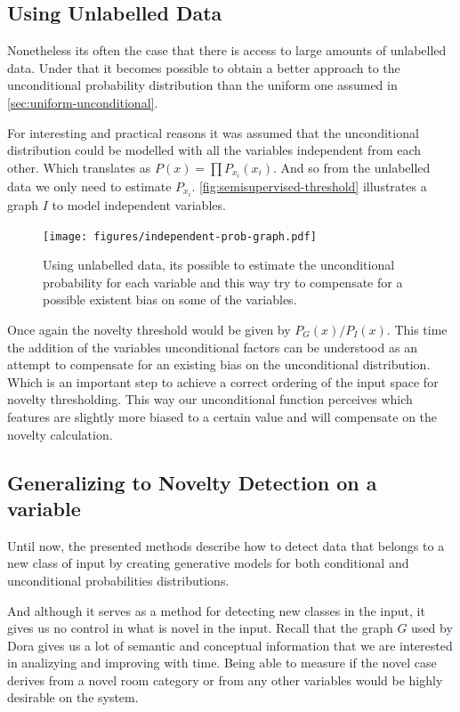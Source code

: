 \documentclass[runningheads,a4paper]{llncs}
\begin{document}
\subsection{Using Unlabelled Data}
Nonetheless its often the case that there is access to large amounts of unlabelled data.
Under that it becomes possible to obtain a better approach to the unconditional probability distribution than
the uniform one assumed in \autoref{sec:uniform-unconditional}.

For interesting and practical reasons it was assumed that the unconditional distribution
could be modelled with all the variables independent from each other.
Which translates as $P(x)=\prod{P_{x_i}(x_i)}$.
And so from the unlabelled data we only need to estimate $P_{x_i}$.
\autoref{fig:semisupervised-threshold} illustrates a graph $I$ to model independent variables.

\begin{figure}[h]
\centering
\texttt{[image: figures/independent-prob-graph.pdf]}
\caption{\label{fig:semisupervised-threshold}Using unlabelled data, its possible to estimate
         the unconditional probability for each variable and this way try to compensate
         for a possible existent bias on some of the variables.}
\end{figure}

Once again the novelty threshold would be given by $P_G(x)/P_I(x)$.
This time the addition of the variables unconditional factors can be understood as an attempt to compensate
for an existing bias on the unconditional distribution.
Which is an important step to achieve a correct ordering of the input space for novelty thresholding.
This way our unconditional function perceives which features are slightly more biased to a certain value
and will compensate on the novelty calculation.

\subsection{Generalizing to Novelty Detection on a variable}
Until now, the presented methods describe how to detect data that belongs to a new class of input by creating
generative models for both conditional and unconditional probabilities distributions.

And although it serves as a method for detecting new classes in the input, it gives us no control in what
is novel in the input.
Recall that the graph $G$ used by Dora gives us a lot of semantic and conceptual information that we are
interested in analizying and improving with time. Being able to measure if the novel case derives from
a novel room category or from any other variables would be highly desirable on the system.
\end{document}
